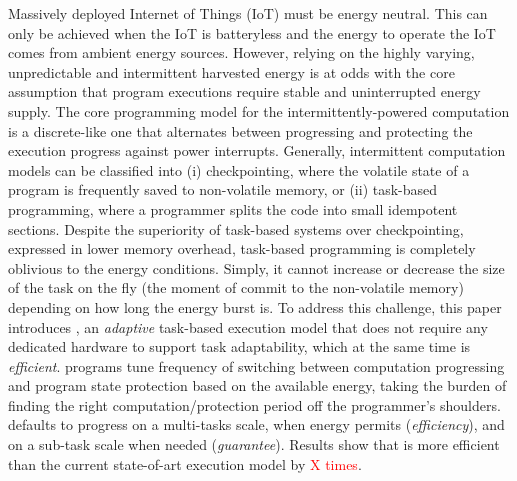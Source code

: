 Massively deployed Internet of Things (IoT) must be energy neutral. This can only be achieved when the IoT is batteryless and the energy to operate the IoT comes from ambient energy sources.
However, relying on the highly varying, unpredictable and intermittent harvested energy is at odds with the core assumption that program executions require stable and uninterrupted energy supply. 
The core programming model for the intermittently-powered computation is a discrete-like one that alternates between progressing and protecting the execution progress against power interrupts.
Generally, intermittent computation models can be classified into (i) checkpointing, where the volatile state of a program is frequently saved to non-volatile memory, or (ii) task-based programming, where a programmer splits the code into small idempotent sections. Despite the superiority of task-based systems over checkpointing, expressed in lower memory overhead, task-based programming is completely oblivious to the energy conditions. Simply, it cannot increase or decrease the size of the task on the fly (the moment of commit to the non-volatile memory) depending on how long the energy burst is. 
To address this challenge, this paper introduces \sys, an \emph{adaptive} task-based execution model that does not require any dedicated hardware to support task adaptability, which at the same time is \emph{efficient}.
\sys programs tune frequency of switching between computation progressing and program state protection based on the available energy, taking the burden of finding the right computation/protection period off the programmer's shoulders.
\sys defaults to progress on a multi-tasks scale, when energy permits (\emph{efficiency}), and on a sub-task scale when needed (\emph{guarantee}).
Results show that \sys is more efficient than the current state-of-art execution model by \textcolor{red}{X times}.

